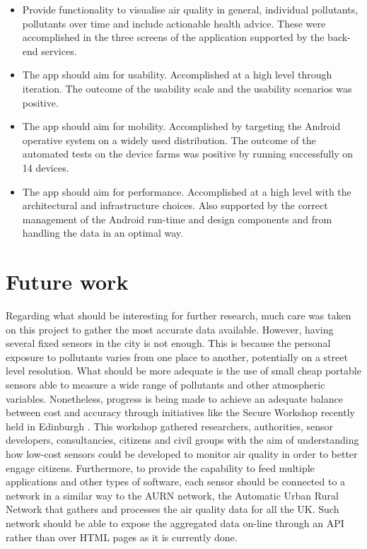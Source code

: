 \begin{itemize}
	\item Provide functionality to visualise air quality in general, individual pollutants, pollutants over time and include actionable health advice. These were accomplished in the three screens of the application supported by the back-end services.
	\item The app should aim for usability. Accomplished at a high level through iteration. The outcome of the usability scale and the usability scenarios was positive. 
    \item The app should aim for mobility. Accomplished by targeting the Android operative system on a widely used distribution. The outcome of the automated tests on the device farms was positive by running successfully on 14 devices.
    \item The app should aim for performance. Accomplished at a high level with the architectural and infrastructure choices. Also supported by the correct management of the Android run-time and design components and from handling the data in an optimal way. 
\end{itemize}

\section{Future work}
Regarding what should be interesting for further research, much care was taken on this project to gather the most accurate data available. However, having several fixed sensors in the city is not enough. This is because the personal exposure to pollutants varies from one place to another, potentially on a street level resolution. What should be more adequate is the use of small cheap portable sensors able to measure a wide range of pollutants and other atmospheric variables. Nonetheless, progress is being made to achieve an adequate balance between cost and accuracy through initiatives like the Secure Workshop recently held in Edinburgh \cite{SecureWorkshop2016}. This workshop gathered researchers, authorities, sensor developers, consultancies, citizens and civil groups with the aim of understanding how low-cost sensors could be developed to monitor air quality in order to better engage citizens. Furthermore, to provide the capability to feed multiple applications and other types of software, each sensor should be connected to a network in a similar way to the AURN network, the Automatic Urban Rural Network that gathers and processes the air quality data for all the UK. Such network should be able to expose the aggregated data on-line through an API rather than over HTML pages as it is currently done.


